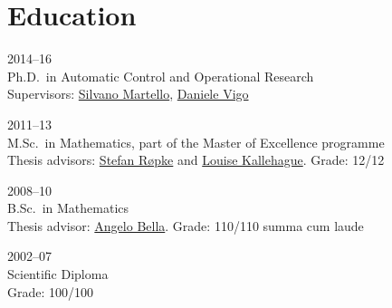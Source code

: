 \section*{Education}

\begin{paracol}{2}
  \textsc{2014--16}
\switchcolumn
  \\
  Ph.D.\ in Automatic Control and Operational Research\\
  Supervisors: \href{https://scholar.google.com/citations?user=o4a20zsAAAAJ}{Silvano Martello}, \href{https://scholar.google.com/citations?user=2kk8d_AAAAAJ}{Daniele Vigo}
\end{paracol}

\begin{paracol}{2}
  \textsc{2011--13}
\switchcolumn
  \\
  M.Sc.\ in Mathematics, part of the Master of Excellence programme\\
  Thesis advisors: \href{https://scholar.google.it/citations?user=sYi141QAAAAJ}{Stefan Røpke} and \href{http://orbit.dtu.dk/en/persons/louise-sibbesen-kallehauge(82eba7e1-4534-4eb7-adf0-c08d856235c5).html}{Louise Kallehague}. Grade: 12/12
\end{paracol}

\begin{paracol}{2}
  \textsc{2008--10}
\switchcolumn
  \\
  B.Sc.\ in Mathematics\\
  Thesis advisor: \href{http://ws1.unict.it/paginadocente/uploads/cit_c34b58e1bdd176c741004d830c9cf271.pdf}{Angelo Bella}. Grade: 110/110 summa cum laude
\end{paracol}

\begin{paracol}{2}
  \textsc{2002--07}
\switchcolumn
  \\
  Scientific Diploma\\
  Grade: 100/100
\end{paracol}
